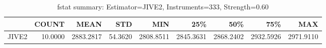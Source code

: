 \begin{table}[ht]
\centering
\caption{fstat summary: Estimator=JIVE2, Instruments=333, Strength=0.60}
\begin{tabular}{lrrrrrrrr}
\toprule
 & COUNT & MEAN & STD & MIN & 25\% & 50\% & 75\% & MAX \\
\midrule
JIVE2 & 10.0000 & 2883.2817 & 54.3620 & 2808.8511 & 2845.3631 & 2868.2402 & 2932.5926 & 2971.9110 \\
\bottomrule
\end{tabular}
\end{table}
